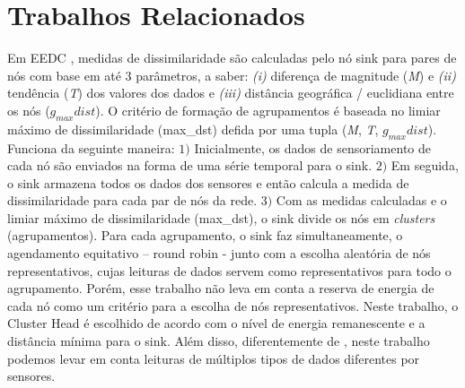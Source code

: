 \documentclass{acm_proc_article-sp}
\begin{document}
\section{Trabalhos Relacionados}
\label{related-work}

Em EEDC \cite{Liu2007}, medidas de dissimilaridade são calculadas pelo 
nó sink para pares de nós com base em até $3$ parâmetros, a saber: {\it (i)}
diferença de magnitude (\textit{M}) e {\it (ii)} tendência (\textit{T}) dos
valores dos dados e {\it (iii)} distância geográfica / euclidiana entre
os nós ($g_{max}dist$).
O critério de formação de agrupamentos é baseada no limiar máximo de
dissimilaridade (max\_dst) defida por uma tupla (\textit{M}, \textit{T},
$g_{max}dist$). Funciona da seguinte maneira: $1)$ Inicialmente, os dados de
sensoriamento de cada nó são enviados na forma de uma série temporal para o
sink. $2)$ Em seguida, o sink armazena todos os dados dos sensores e então
calcula a medida de dissimilaridade para cada par de nós da rede. $3)$ Com as
medidas calculadas e o limiar máximo de dissimilaridade (max\_dst), o sink
divide os nós em {\it clusters} (agrupamentos). Para cada agrupamento, o sink faz
simultaneamente, o agendamento equitativo – round robin - junto com a escolha
aleatória de nós representativos, cujas leituras de dados servem como
representativos para todo o agrupamento. Porém, esse trabalho não leva em conta
a reserva de energia de cada nó como um critério para a escolha de nós
representativos. Neste trabalho, o Cluster Head é escolhido de acordo com o
nível de energia remanescente e a distância mínima para o sink.
Além disso, diferentemente de \cite{Liu2007}, neste trabalho podemos levar em
conta leituras de múltiplos tipos de dados diferentes por sensores.
\vspace*{-.3cm}
\end{document}
